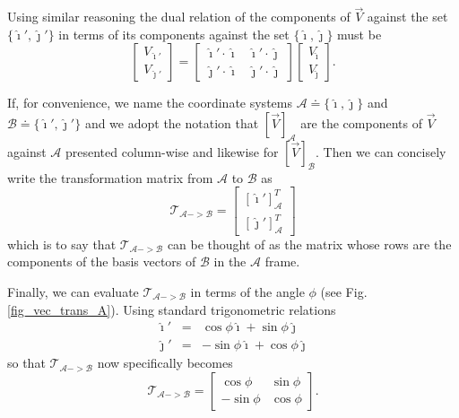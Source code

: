 \documentclass[10pt]{article}
\begin{document}
Using similar reasoning the dual relation of the components of $\vec V$ 
against the set $\{ \hat \imath', \hat \jmath' \}$ in terms of its
components against the set $\{\hat \imath, \hat \jmath\}$ must be
\begin{equation}\label{vec_rel_C}
\left[ \begin{array}{c} V_{\hat \imath'} \\ V_{\hat \jmath'} \end{array} \right]
   = 
\left[ \begin{array}{cc} \hat \imath' \cdot \hat \imath & \hat \imath' \cdot \hat \jmath \\
                          \hat \jmath' \cdot \hat \imath & \hat \jmath' \cdot \hat \jmath 
        \end{array} \right]
\left[ \begin{array}{c} V_{\hat \imath} \\ V_{\hat \jmath} \end{array} \right] .
\end{equation}

If, for convenience, we name the coordinate systems ${\mathcal A} \doteq \{\hat \imath, \hat \jmath\}$
and ${\mathcal B} \doteq \{\hat \imath', \hat \jmath'\}$ and we adopt the notation
that $\left[ \vec V \right]_{\mathcal A}$ are the components of $\vec V$ against $\mathcal A$
presented column-wise and likewise for $\left[ \vec V \right]_{\mathcal B}$.  Then we
can concisely write the transformation matrix from $\mathcal A$ to $\mathcal B$ as
\begin{equation}\label{trans_matrix_A}
  {\mathcal T}_{ {\mathcal A} -> {\mathcal B} } = 
     \left[ \begin{array}{c} {\left[ \hat \imath' \right]}^{T}_{\mathcal A} \\ 
                             {\left[ \hat \jmath' \right]}^{T}_{\mathcal A}
            \end{array} \right]
\end{equation}
which is to say that ${\mathcal T}_{ {\mathcal A} -> {\mathcal B} }$ can be thought of 
as the matrix whose rows are the components of the basis vectors of $\mathcal B$ in 
the $\mathcal A$ frame.

Finally, we can evaluate ${\mathcal T}_{ {\mathcal A} -> {\mathcal B} }$ in terms 
of the angle $\phi$ (see Fig. \ref{fig_vec_trans_A}).  Using standard trigonometric
relations
\begin{eqnarray}\label{vec_rel_D}
  \hat \imath' &= &  \cos \phi \hat \imath + \sin \phi \hat \jmath \\
  \hat \jmath' &= & -\sin \phi \hat \imath + \cos \phi \hat \jmath
\end{eqnarray}
so that ${\mathcal T}_{ {\mathcal A} -> {\mathcal B} }$  now specifically becomes
\begin{equation}\label{trans_matrix_B}
  {\mathcal T}_{ {\mathcal A} -> {\mathcal B} } = 
  \left[ \begin{array}{cc} \cos \phi & \sin \phi \\ -\sin \phi & \cos \phi \end{array} \right] .
\end{equation}
\end{document}
